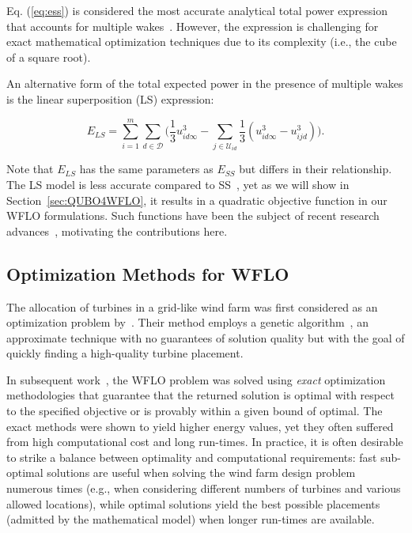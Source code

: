 \documentclass[preprint,12pt]{elsarticle}
\newcommand{\todo}[1]{{\textcolor{red}{\bf {#1}}}}
\begin{document}
  Eq. (\ref{eq:ess}) is considered the most accurate analytical total power expression that accounts for multiple wakes~\cite{jensen1983note}. 
  However, the expression is challenging for exact mathematical optimization techniques due to its complexity (i.e., the cube of a square root).

An alternative 
form of the total expected power in the presence of multiple wakes is the linear superposition (LS) expression:

\begin{equation} \label{eq:ls}
E_{LS} = \sum_{i=1}^m \sum_{d\in\mathcal{D}} \Bigg(\frac{1}{3}u_{id\infty}^3 -\sum_{j\in\mathcal{U}_{id}} \frac{1}{3}(u_{id\infty}^3 - u_{ijd}^3)\Bigg).
\end{equation}

Note that $E_{LS}$ has the same parameters as $E_{SS}$ but differs in their relationship.
The LS model is less accurate compared to SS~\cite{Zhang2014}, yet as we will show in Section~\ref{sec:QUBO4WFLO}, it 
 results in a quadratic objective function in our WFLO formulations. Such functions have been the subject of recent research advances~\cite{ku2017hybrid,bian2010ising}, motivating the contributions here.
 

\subsection{Optimization Methods for WFLO}

The allocation of turbines in a grid-like wind farm was first
considered as an optimization problem by~\citet{MOSETTI1994105}. Their
method employs a genetic
algorithm~\cite{davis1991handbook}, an approximate technique
with no guarantees of solution quality but with the goal of quickly finding a high-quality turbine placement.


In subsequent work~\cite{turner2014new,Zhang2014}, 
the WFLO problem was solved using \emph{exact}  
optimization methodologies that guarantee that the returned solution is optimal with respect
to the specified objective or is provably within a given bound of optimal.
The exact methods were shown to yield higher energy values, yet they often suffered from 
high computational cost and long run-times. In practice, it is often desirable to strike a balance between optimality and computational requirements: fast sub-optimal solutions are useful when solving the wind farm design problem numerous times (e.g., when considering different numbers of turbines and various allowed locations), while optimal solutions yield the best possible placements (admitted by the mathematical model) when longer run-times are available.
\end{document}
